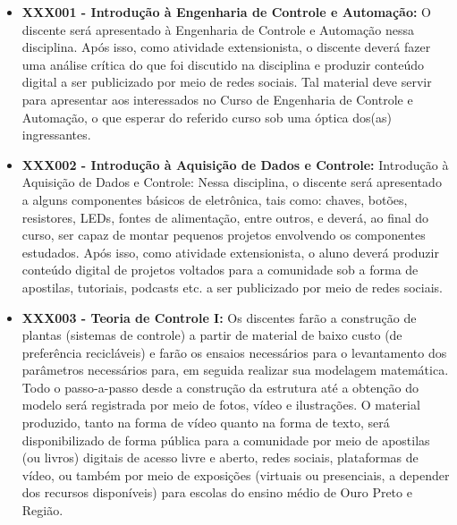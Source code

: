 \documentclass[
	12pt,				%
	openright,			%
	oneside,			%
	a4paper,			%
	english,			%
	brazil				%
	]{abntex2}
\begin{document}
\begin{itemize}
    \item \textbf{XXX001 - Introdução à Engenharia de Controle e Automação:} O discente  será apresentado à Engenharia de Controle e Automação nessa disciplina. Após isso, como atividade extensionista, o discente deverá fazer uma análise crítica do que foi discutido na disciplina e produzir conteúdo digital a ser publicizado por meio de redes sociais. Tal material deve servir para apresentar aos interessados no Curso de Engenharia de Controle e Automação, o que esperar do referido curso sob uma óptica dos(as) ingressantes.

    \item \textbf{XXX002 - Introdução à Aquisição de Dados e Controle:} Introdução à Aquisição de Dados e Controle: Nessa disciplina, o discente será apresentado a alguns componentes básicos de eletrônica, tais como: chaves, botões, resistores, LEDs, fontes de alimentação, entre outros, e deverá, ao final do curso, ser capaz de montar pequenos projetos envolvendo os componentes estudados. Após isso, como atividade extensionista, o aluno deverá produzir conteúdo digital de projetos voltados para a comunidade sob a forma de apostilas, tutoriais, podcasts etc. a ser publicizado por meio de redes sociais.

    \item \textbf{XXX003 - Teoria de Controle I:} Os discentes farão a construção de plantas (sistemas de controle) a partir de material de baixo custo (de preferência recicláveis) e farão os ensaios necessários para o levantamento dos parâmetros necessários para, em seguida realizar sua modelagem matemática. Todo o passo-a-passo desde a construção da estrutura até a obtenção do modelo será registrada por meio de fotos, vídeo e ilustrações. O material produzido, tanto na forma de vídeo quanto na forma de texto, será disponibilizado de forma pública para a comunidade por meio de apostilas (ou livros) digitais de acesso livre e aberto, redes sociais, plataformas de vídeo, ou também por meio de exposições (virtuais ou presenciais, a depender dos recursos disponíveis) para escolas do ensino médio de Ouro Preto e Região.


\end{itemize}
\end{document}
